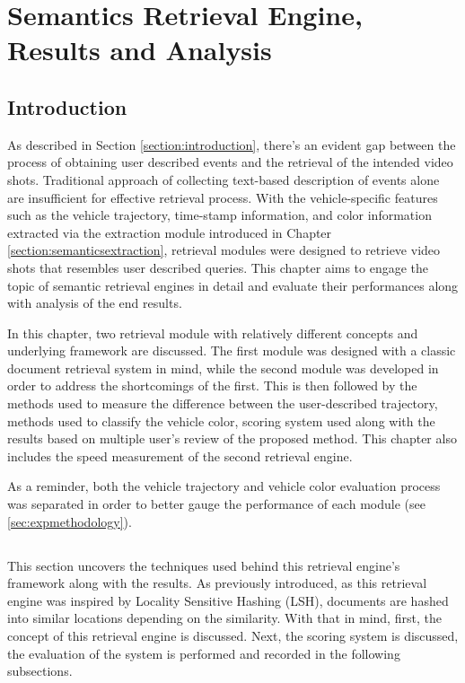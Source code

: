 
\chapter{Semantics Retrieval Engine, Results and Analysis}

\label{section:retrievalengine}
\section{Introduction}

As described in Section \ref{section:introduction}, there's an evident gap between the process of obtaining user described events and the retrieval of the intended video shots. Traditional approach of collecting text-based description of events alone are insufficient for effective retrieval process. With the vehicle-specific features such as the vehicle trajectory, time-stamp information, and color information extracted via the extraction module introduced in Chapter \ref{section:semanticsextraction}, retrieval modules were designed to retrieve video shots that resembles user described queries. This chapter aims to engage the topic of semantic retrieval engines in detail and evaluate their performances along with analysis of the end results.

In this chapter, two retrieval module with relatively different concepts and underlying framework are discussed. The first module was designed with a classic document retrieval system in mind, while the second module was developed in order to address the shortcomings of the first. This is then followed by the methods used to measure the difference between the user-described trajectory, methods used to classify the vehicle color, scoring system used along with the results based on multiple user's review of the proposed method. This chapter also includes the speed measurement of the second retrieval engine.

As a reminder, both the vehicle trajectory and vehicle color evaluation process was separated in order to better gauge the performance of each module (see \ref{sec:expmethodology}).






\section{\versionOne}
This section uncovers the techniques used behind this retrieval engine's framework along with the results. As previously introduced, as this retrieval engine was inspired by Locality Sensitive Hashing (LSH), documents are hashed into similar locations depending on the similarity. With that in mind, first, the concept of this retrieval engine is discussed. Next, the scoring system is discussed, the evaluation of the system is performed and recorded in the following subsections.




